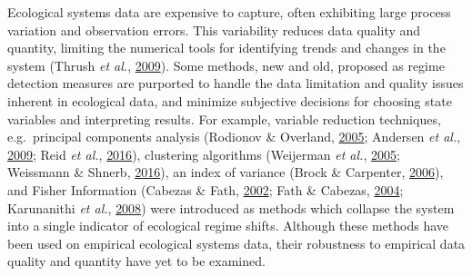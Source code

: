 \documentclass[print]{nuthesis}
\begin{document}
Ecological systems data are expensive to capture, often exhibiting large process variation and observation errors. This variability reduces data quality and quantity, limiting the numerical tools for identifying trends and changes in the system (Thrush \emph{et al.}, \protect\hyperlink{ref-thrush2009forecasting}{2009}). Some methods, new and old, proposed as regime detection measures are purported to handle the data limitation and quality issues inherent in ecological data, and minimize subjective decisions for choosing state variables and interpreting results. For example, variable reduction techniques, e.g.~principal components analysis (Rodionov \& Overland, \protect\hyperlink{ref-rodionov_application_2005}{2005}; Andersen \emph{et al.}, \protect\hyperlink{ref-andersen_ecological_2009}{2009}; Reid \emph{et al.}, \protect\hyperlink{ref-reid_global_2016}{2016}), clustering algorithms (Weijerman \emph{et al.}, \protect\hyperlink{ref-weijerman2005regime}{2005}; Weissmann \& Shnerb, \protect\hyperlink{ref-weissmann2016predicting}{2016}), an index of variance (Brock \& Carpenter, \protect\hyperlink{ref-brock_variance_2006}{2006}), and Fisher Information (Cabezas \& Fath, \protect\hyperlink{ref-cabezas_towards_2002}{2002}; Fath \& Cabezas, \protect\hyperlink{ref-fath_exergy_2004}{2004}; Karunanithi \emph{et al.}, \protect\hyperlink{ref-karunanithi_detection_2008}{2008}) were introduced as methods which collapse the system into a single indicator of ecological regime shifts. Although these methods have been used on empirical ecological systems data, their robustness to empirical data quality and quantity have yet to be examined.
\end{document}
